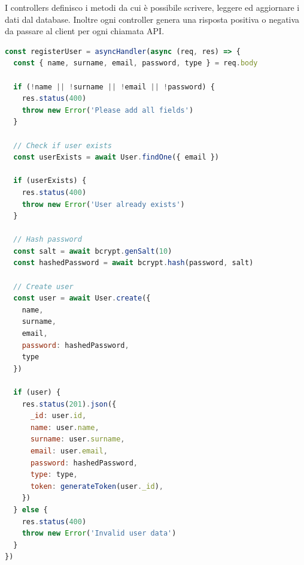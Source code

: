 \documentclass{report}
\begin{document}
\par I controllers definisco i metodi da cui è possibile scrivere, leggere ed aggiornare i dati dal database. Inoltre ogni controller genera una risposta positiva o negativa da passare al client per ogni chiamata API. 
\begin{lstlisting}[language=JavaScript]
const registerUser = asyncHandler(async (req, res) => {
  const { name, surname, email, password, type } = req.body

  if (!name || !surname || !email || !password) {
    res.status(400)
    throw new Error('Please add all fields')
  }

  // Check if user exists
  const userExists = await User.findOne({ email })

  if (userExists) {
    res.status(400)
    throw new Error('User already exists')
  }

  // Hash password
  const salt = await bcrypt.genSalt(10)
  const hashedPassword = await bcrypt.hash(password, salt)

  // Create user
  const user = await User.create({
    name,
    surname,
    email,
    password: hashedPassword,
    type
  })

  if (user) {
    res.status(201).json({
      _id: user.id,
      name: user.name,
      surname: user.surname,
      email: user.email,
      password: hashedPassword,
      type: type,
      token: generateToken(user._id),
    })
  } else {
    res.status(400)
    throw new Error('Invalid user data')
  }
})
\end{lstlisting}
\end{document}
